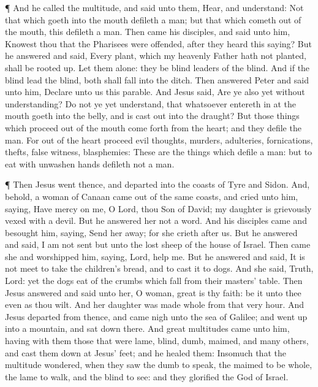  ¶ And he called the multitude, and said unto them, Hear,
and understand:  Not that which goeth into the mouth
defileth a man; but that which cometh out of the mouth, this defileth a
man.  Then came his disciples, and said unto him, Knowest
thou that the Pharisees were offended, after they heard this saying?
 But he answered and said, Every plant, which my heavenly
Father hath not planted, shall be rooted up.  Let them
alone: they be blind leaders of the blind. And if the blind lead the
blind, both shall fall into the ditch.  Then answered Peter
and said unto him, Declare unto us this parable.  And Jesus
said, Are ye also yet without understanding?  Do not ye yet
understand, that whatsoever entereth in at the mouth goeth into the
belly, and is cast out into the draught?  But those things
which proceed out of the mouth come forth from the heart; and they
defile the man.  For out of the heart proceed evil
thoughts, murders, adulteries, fornications, thefts, false witness,
blasphemies:  These are the things which defile a man: but
to eat with unwashen hands defileth not a man.

 ¶ Then Jesus went thence, and departed into the coasts of
Tyre and Sidon.  And, behold, a woman of Canaan came out of
the same coasts, and cried unto him, saying, Have mercy on me, O Lord,
thou Son of David; my daughter is grievously vexed with a devil.
 But he answered her not a word. And his disciples came and
besought him, saying, Send her away; for she crieth after us.
 But he answered and said, I am not sent but unto the lost
sheep of the house of Israel.  Then came she and worshipped
him, saying, Lord, help me.  But he answered and said, It
is not meet to take the children's bread, and to cast it to dogs.
 And she said, Truth, Lord: yet the dogs eat of the crumbs
which fall from their masters' table.  Then Jesus answered
and said unto her, O woman, great is thy faith: be it unto thee even as
thou wilt. And her daughter was made whole from that very hour.
 And Jesus departed from thence, and came nigh unto the sea
of Galilee; and went up into a mountain, and sat down there.
 And great multitudes came unto him, having with them those
that were lame, blind, dumb, maimed, and many others, and cast them down
at Jesus' feet; and he healed them:  Insomuch that the
multitude wondered, when they saw the dumb to speak, the maimed to be
whole, the lame to walk, and the blind to see: and they glorified the
God of Israel.

